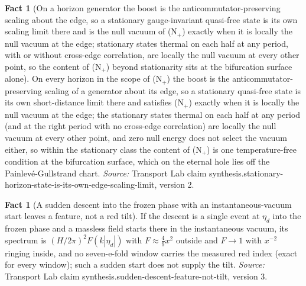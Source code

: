 \documentclass[11pt]{article}
\theoremstyle{definition}
\newtheorem{fact}[theorem]{Fact}
\theoremstyle{plain}
\begin{document}
\begin{fact}[On a horizon generator the boost is the anticommutator-preserving scaling about the edge, so a stationary gauge-invariant quasi-free state is its own scaling limit there and is the null vacuum of (N$_{+}$) exactly when it is locally the null vacuum at the edge; stationary states thermal on each half at any period, with or without cross-edge correlation, are locally the null vacuum at every other point, so the content of (N$_{+}$) beyond stationarity sits at the bifurcation surface alone]\label{c:synthesis.stationary-horizon-state-is-its-own-edge-scaling-limit}
On every horizon in the scope of (N$_{+}$) the boost is the anticommutator-preserving scaling of a generator about its edge, so a stationary quasi-free state is its own short-distance limit there and satisfies (N$_{+}$) exactly when it is locally the null vacuum at the edge; the stationary states thermal on each half at any period (and at the right period with no cross-edge correlation) are locally the null vacuum at every other point, and zero null energy does not select the vacuum either, so within the stationary class the content of (N$_{+}$) is one temperature-free condition at the bifurcation surface, which on the eternal hole lies off the Painlev\'e-Gullstrand chart.
\emph{Source:} Transport Lab claim synthesis.stationary-horizon-state-is-its-own-edge-scaling-limit, version 2.
\end{fact}

\begin{fact}[A sudden descent into the frozen phase with an instantaneous-vacuum start leaves a feature, not a red tilt]\label{c:synthesis.sudden-descent-feature-not-tilt}
If the descent is a single event at $\eta_d$ into the frozen phase and a massless field starts there in the instantaneous vacuum, its spectrum is $(H/2\pi)^{2}F(k|\eta_d|)$ with $F \approx \tfrac49 x^{2}$ outside and $F \to 1$ with $x^{-2}$ ringing inside, and no seven-e-fold window carries the measured red index (exact for every window); such a sudden start does not supply the tilt.
\emph{Source:} Transport Lab claim synthesis.sudden-descent-feature-not-tilt, version 3.
\end{fact}
\end{document}
